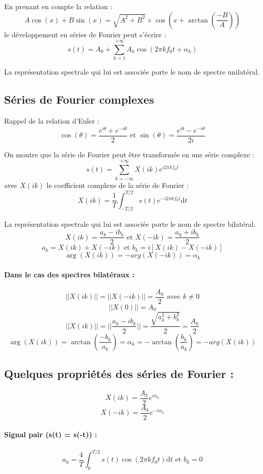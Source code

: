 \documentclass[a4paper,12pt]{article}
\begin{document}
En prenant en compte la relation :
\[ A \cos(x) + B \sin(x) = \sqrt{A^2 + B^2} \times \cos(x + \arctan(\dfrac{-B}{A})) \]
le développement en séries de Fourier peut s'écrire :
\[ s(t) = A_0 + \sum_{k=1}^{+\infty} A_k \cos(2\pi kf_0 t + \alpha_k) \]

La représentation spectrale qui lui est associée porte le nom de spectre unilatéral.

\subsection{Séries de Fourier complexes}

Rappel de la relation d'Euler :
\[ \cos(\theta) = \dfrac{e^{i\theta} + e^{-i\theta}}{2} \text{ et } \sin(\theta) = \dfrac{e^{i\theta} - e^{-i\theta}}{2i} \]

On montre que la série de Fourier peut être transformée en une série complexe :
\[ s(t) = \sum_{k = -\infty}^{+\infty} X(ik) e^{i2\pi kf_0 t} \]
avec $X(ik)$ le coefficient complexe de la série de Fourier :
\[ X(ik) = \dfrac{1}{T} \int_{-T/2}^{T/2} s(t) e^{-i2\pi kf_0 t} \mathrm{d}t \]

La représentation spectrale qui lui est associée porte le nom de spectre bilatéral.
\[ X(ik) = \dfrac{a_k - ib_k}{2} \text{ et } X(-ik) = \dfrac{a_k + ib_k}{2} \]
\[ a_k = X(ik) + X(-ik) \text{ et } b_k = i[X(ik) - X(-ik)] \]
\[ \arg(X(ik)) = -arg(X(-ik)) = \alpha_k \]

\paragraph{Dans le cas des spectres bilatéraux :}
\[ ||X(ik)|| = ||X(-ik)|| = \dfrac{A_k}{2} \text{ avec } k\neq0 \]
\[ ||X(0)|| = A_0 \]
\[ ||X(ik)|| = ||\dfrac{a_k - ib_k}{2}|| = \dfrac{\sqrt{a^{2}_{k} + b^{2}_{k}}}{2} = \dfrac{A_k}{2} \]
\[ \arg(X(ik)) = \arctan(\dfrac{-b_k}{a_k}) = \alpha_k = -\arctan(\dfrac{b_k}{a_k}) = -arg(X(ik)) \]

\subsection{Quelques propriétés des séries de Fourier :}
\[ X(ik) = \dfrac{A_k}{2} e^{i\alpha_k} \]
\[ X(-ik) = \dfrac{A_k}{2} e^{-i\alpha_k} \]

\paragraph{Signal pair (s(t) = s(-t)) :}
\[ a_k = \dfrac{4}{T} \int_{0}^{T/2} s(t) \cos(2\pi kf_0 t) \mathrm{d}t \text{ et } b_k = 0 \]
\end{document}
